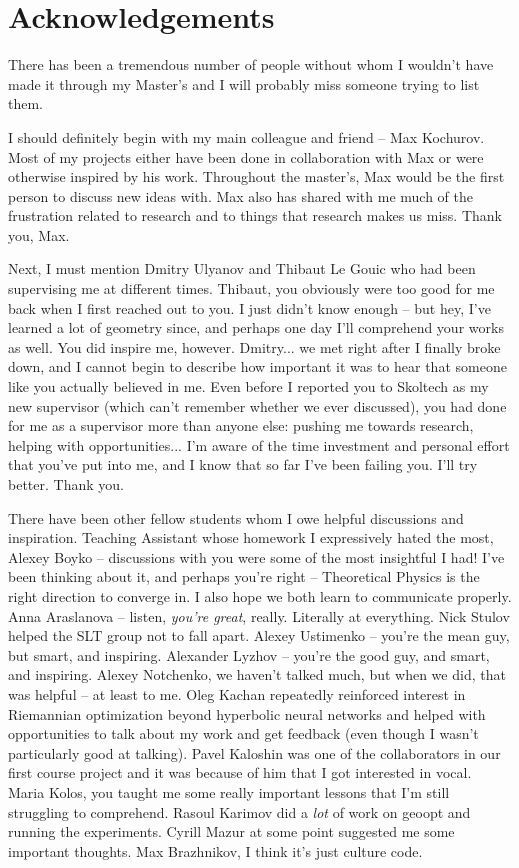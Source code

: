 \section*{Acknowledgements}

There has been a tremendous number of people without whom I wouldn't have made
it through my Master's and I will probably miss someone trying to list them.

I should definitely begin with my main colleague and friend -- Max Kochurov.
Most of my projects either have been done in collaboration with Max or were
otherwise inspired by his work. Throughout the master's, Max would be the first
person to discuss new ideas with. Max also has shared with me much of the
frustration related to research and to things that research makes us miss.
Thank you, Max.

Next, I must mention Dmitry Ulyanov and Thibaut Le Gouic who had been
supervising me at different times. Thibaut, you obviously were too good for me
back when I first reached out to you. I just didn't know enough -- but hey,
I've learned a lot of geometry since, and perhaps one day I'll comprehend your
works as well.  You did inspire me, however. Dmitry... we met right after I
finally broke down, and I cannot begin to describe how important it was to hear
that someone like you actually believed in me. Even before I reported
you to Skoltech as my new supervisor (which can't remember whether we ever
discussed), you had done for me as a supervisor more than anyone else:
pushing me towards research, helping with opportunities... I'm aware of the
time investment and personal effort that you've put into me, and I know that so
far I've been failing you. I'll try better. Thank you.

There have been other fellow students whom I owe helpful discussions and
inspiration. Teaching Assistant whose homework I expressively hated the most,
Alexey Boyko -- discussions with you were some of the most insightful I had!
I've been thinking about it, and perhaps you're right -- Theoretical Physics is
the right direction to converge in. I also hope we both learn to communicate
properly.
Anna Araslanova -- listen, \emph{you're great}, really. Literally at
everything.
Nick Stulov helped the SLT group not to fall apart.
Alexey Ustimenko -- you're the mean guy, but smart, and inspiring.
Alexander Lyzhov -- you're the good guy, and smart, and inspiring.
Alexey Notchenko, we haven't talked much, but when we did, that was
helpful -- at least to me. Oleg Kachan repeatedly reinforced interest in
Riemannian optimization beyond hyperbolic neural networks and helped with
opportunities to talk about my work and get feedback (even though I wasn't
particularly good at talking).
Pavel Kaloshin was one of the collaborators in our first course project and it
was because of him that I got interested in vocal.
Maria Kolos, you taught me some really important lessons that I'm still
struggling to comprehend.
Rasoul Karimov did a \emph{lot} of work on geoopt and running the experiments.
Cyrill Mazur at some point suggested me some important thoughts.
Max Brazhnikov, I think it's just culture code.

